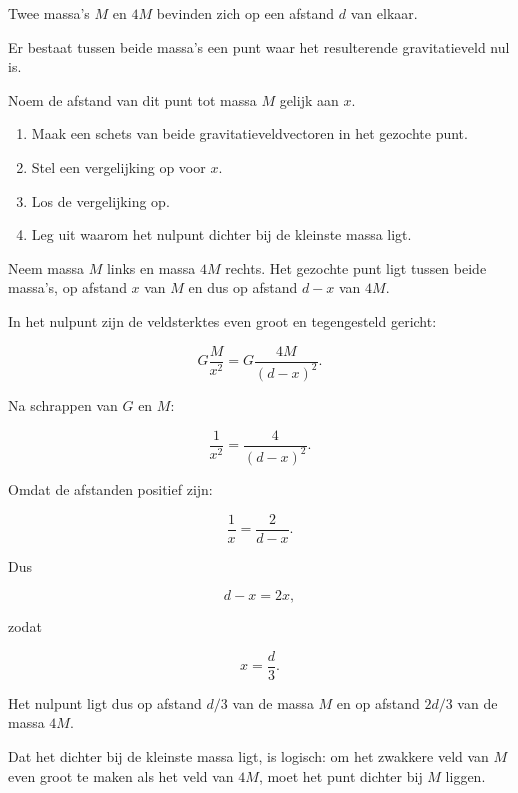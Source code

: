 \documentclass{ximera}
\begin{document}
\begin{oefening}{\oefG}

Twee massa's $M$ en $4M$ bevinden zich op een afstand $d$ van elkaar.

Er bestaat tussen beide massa's een punt waar het resulterende
gravitatieveld nul is.

Noem de afstand van dit punt tot massa $M$ gelijk aan $x$.

\begin{enumerate}
  \item Maak een schets van beide gravitatieveldvectoren in het gezochte
        punt.
  \item Stel een vergelijking op voor $x$.
  \item Los de vergelijking op.
  \item Leg uit waarom het nulpunt dichter bij de kleinste massa ligt.
\end{enumerate}


\begin{oplossing}

Neem massa $M$ links en massa $4M$ rechts. Het gezochte punt ligt
tussen beide massa's, op afstand $x$ van $M$ en dus op afstand $d-x$
van $4M$.

In het nulpunt zijn de veldsterktes even groot en tegengesteld gericht:

\[
G\frac{M}{x^2}
=
G\frac{4M}{(d-x)^2}.
\]

Na schrappen van $G$ en $M$:

\[
\frac{1}{x^2}
=
\frac{4}{(d-x)^2}.
\]

Omdat de afstanden positief zijn:

\[
\frac1x=\frac{2}{d-x}.
\]

Dus

\[
d-x=2x,
\]

zodat

\[
\boxed{
x=\frac d3.
}
\]

Het nulpunt ligt dus op afstand $d/3$ van de massa $M$ en op afstand
$2d/3$ van de massa $4M$.

Dat het dichter bij de kleinste massa ligt, is logisch: om het zwakkere
veld van $M$ even groot te maken als het veld van $4M$, moet het punt
dichter bij $M$ liggen.

\end{oplossing}

\end{oefening}


\end{document}

